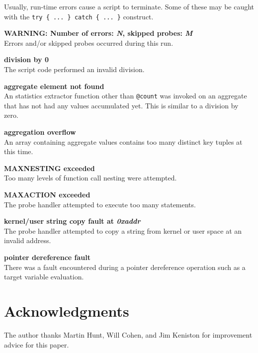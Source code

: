 \documentclass{article}
\renewcommand{\nomenclature}[2]{}
\begin{document}
Usually, run-time errors cause a script to terminate.  Some of these
may be caught with the \verb+try { ... } catch { ... }+ construct.

\begin{description}

\item{\bf WARNING: Number of errors: {\em N}, skipped probes: {\em M}} \\
Errors and/or skipped probes occurred during this run.
\nomenclature{skipped probe}{A probe handler that should have run but
couldn't, due to contention or temporary resource problems.}

\item{\bf division by 0} \\ The script code performed an invalid
division.

\item{\bf aggregate element not found} \\ An statistics extractor
function other than \verb+@count+ was invoked on an aggregate that has
not had any values accumulated yet.  This is similar to a division by
zero.

\item{\bf aggregation overflow} \\ An array containing aggregate
values contains too many distinct key tuples at this time.

\item{\bf MAXNESTING exceeded} \\ Too many levels of function call nesting
were attempted.

\item{\bf MAXACTION exceeded} \\ The probe handler attempted to execute
too many statements.

\item{\bf kernel/user string copy fault at {\em 0xaddr}} \\
The probe handler attempted to copy a string from kernel or user space
at an invalid address. 

\item{\bf pointer dereference fault} \\ 
There was a fault encountered during a pointer dereference operation such
as a target variable evaluation.

\end{description}


\section{Acknowledgments}

The author thanks Martin Hunt, Will Cohen, and Jim Keniston for
improvement advice for this paper.
\end{document}
